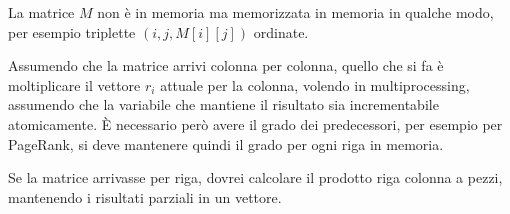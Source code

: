 La matrice $M$ non è in memoria ma memorizzata in memoria in qualche modo, per esempio
triplette $(i,j, M[i][j])$ ordinate.

Assumendo che la matrice arrivi colonna per colonna, quello che si fa è moltiplicare 
il vettore $r_i$ attuale per la colonna, volendo in multiprocessing, assumendo che la 
variabile che mantiene il risultato sia incrementabile atomicamente. 
È necessario però avere il grado dei predecessori, per esempio per PageRank, 
si deve mantenere quindi il grado per ogni riga in memoria.

Se la matrice arrivasse per riga, dovrei calcolare il prodotto riga colonna a pezzi, 
mantenendo i risultati parziali in un vettore.

